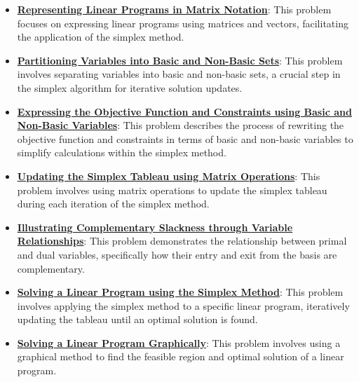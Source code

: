 \documentclass{article}%
\begin{document}
\begin{itemize}[leftmargin=*]%
\item \href{https://www.math.purdue.edu/~yipn/421/2024-09-24-SimplexMatrix.pdf#page=1}{\textbf{Representing Linear Programs in Matrix Notation}}: This problem focuses on expressing linear programs using matrices and vectors, facilitating the application of the simplex method.%
\item \href{https://www.math.purdue.edu/~yipn/421/2024-09-24-SimplexMatrix.pdf#page=4}{\textbf{Partitioning Variables into Basic and Non{-}Basic Sets}}: This problem involves separating variables into basic and non-basic sets, a crucial step in the simplex algorithm for iterative solution updates.%
\item \href{https://www.math.purdue.edu/~yipn/421/2024-09-24-SimplexMatrix.pdf#page=8}{\textbf{Expressing the Objective Function and Constraints using Basic and Non{-}Basic Variables}}: This problem describes the process of rewriting the objective function and constraints in terms of basic and non-basic variables to simplify calculations within the simplex method.%
\item \href{https://www.math.purdue.edu/~yipn/421/2024-09-24-SimplexMatrix.pdf#page=10}{\textbf{Updating the Simplex Tableau using Matrix Operations}}: This problem involves using matrix operations to update the simplex tableau during each iteration of the simplex method.%
\item \href{https://www.math.purdue.edu/~yipn/421/2024-09-24-SimplexMatrix.pdf#page=14}{\textbf{Illustrating Complementary Slackness through Variable Relationships}}: This problem demonstrates the relationship between primal and dual variables, specifically how their entry and exit from the basis are complementary.%
\item \href{https://www.math.purdue.edu/~yipn/421/2024-09-24-SimplexMatrix.pdf#page=15}{\textbf{Solving a Linear Program using the Simplex Method}}: This problem involves applying the simplex method to a specific linear program, iteratively updating the tableau until an optimal solution is found.%
\item \href{https://www.math.purdue.edu/~yipn/421/2024-09-24-SimplexMatrix.pdf#page=21}{\textbf{Solving a Linear Program Graphically}}: This problem involves using a graphical method to find the feasible region and optimal solution of a linear program.%
\end{itemize}%
\end{document}
